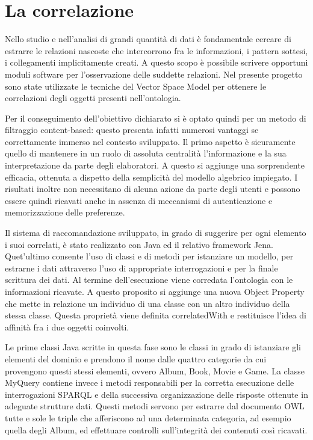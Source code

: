 \documentclass[Lau,binding=0.6cm,noexaminfo,oneside]{sapthesis}
\begin{document}
\section{La correlazione}

Nello studio e nell'analisi di grandi quantità di dati è fondamentale cercare di estrarre le relazioni nascoste che intercorrono fra le informazioni, i pattern sottesi, i collegamenti implicitamente creati. A questo scopo è possibile scrivere opportuni moduli software per l'osservazione delle suddette relazioni. Nel presente progetto sono state utilizzate le tecniche del Vector Space Model per ottenere le correlazioni degli oggetti presenti nell'ontologia.\medskip

Per il conseguimento dell'obiettivo dichiarato si è optato quindi per un metodo di filtraggio content-based: questo presenta infatti numerosi vantaggi se correttamente immerso nel contesto sviluppato. Il primo aspetto è sicuramente quello di mantenere in un ruolo di assoluta centralità l'informazione e la sua interpretazione da parte degli elaboratori. A questo si aggiunge una sorprendente efficacia, ottenuta a dispetto della semplicità del modello algebrico impiegato. I risultati inoltre non necessitano di alcuna azione da parte degli utenti e possono essere quindi ricavati anche in assenza di meccanismi di autenticazione e memorizzazione delle preferenze.\medskip

Il sistema di raccomandazione sviluppato, in grado di suggerire per ogni elemento i suoi correlati, è stato realizzato con Java ed il relativo framework Jena. Quet'ultimo consente l'uso di classi e di metodi per istanziare un modello, per estrarne i dati attraverso l'uso di appropriate interrogazioni e per la finale scrittura dei dati. Al termine dell'esecuzione viene corredata l'ontologia con le informazioni ricavate. A questo proposito si aggiunge una nuova Object Property che mette in relazione un individuo di una classe con un altro individuo della stessa classe. Questa proprietà viene definita correlatedWith e restituisce l'idea di affinità fra i due oggetti coinvolti.\medskip

Le prime classi Java scritte in questa fase sono le classi in grado di istanziare gli elementi del dominio e prendono il nome dalle quattro categorie da cui provengono questi stessi elementi, ovvero Album, Book, Movie e Game. La classe MyQuery contiene invece i metodi responsabili per la corretta esecuzione delle interrogazioni SPARQL e della successiva organizzazione delle risposte ottenute in adeguate strutture dati. Questi metodi servono per estrarre dal documento OWL tutte e sole le triple che afferiscono ad una determinata categoria, ad esempio quella degli Album, ed effettuare controlli sull'integrità dei contenuti così ricavati.\medskip
\end{document}
